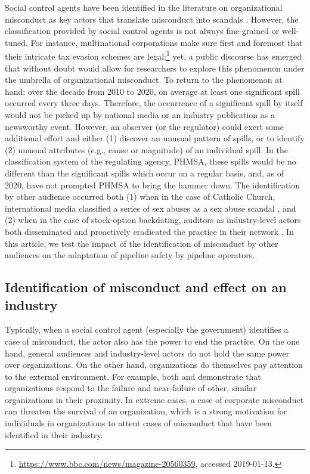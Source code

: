 Social control agents have been identified in the literature on organizational misconduct as key actors that translate misconduct into scandals \citep{Greve2010}. However, the classification provided by social control agents is not always fine-grained or well-tuned. For instance, multinational corporations make sure first and foremost that their intricate tax evasion schemes are legal;\footnote{\url{https://www.bbc.com/news/magazine-20560359}, accessed 2019-01-13.} yet, a public discourse has emerged that without doubt would allow for researchers to explore this phenomenon under the umbrella of organizational misconduct. To return to the phenomenon at hand: over the decade from 2010 to 2020, on average at least one significant spill occurred every three days. Therefore, the occurrence of a significant spill by itself would not be picked up by national media or an industry publication as a newsworthy event. However, an observer (or the regulator) could exert some additional effort and either (1) discover an unusual pattern of spills, or to identify (2) unusual attributes (e.g., cause or magnitude) of an individual spill. In the classification system of the regulating agency, PHMSA, these spills would be no different than the significant spills which occur on a regular basis, and, as of 2020, have not prompted PHMSA to bring the hammer down. The identification by other audience occurred both (1) when in the case of Catholic Church, international media classified a series of sex abuses as a sex abuse scandal \citep{Piazza2018}, and (2) when in the case of stock-option backdating, auditors as industry-level actors both disseminated and proactively eradicated the practice in their network \citep{Mohliver2019}. In this article, we test the impact of the identification of misconduct by other audiences on the adaptation of pipeline safety by pipeline operators.
	
\subsection{Identification of misconduct and effect on an industry}

Typically, when a social control agent (especially the government) identifies a case of misconduct, the actor also has the power to end the practice. On the one hand, general audiences and industry-level actors do not hold the same power over organizations. On the other hand, organizations do themselves pay attention to the external environment. For example, both \citet{Kim2007} and \citet{Madsen2010} demonstrate that organizations respond to the failure and near-failure of other, similar organizations in their proximity. In extreme cases, a case of corporate misconduct can threaten the survival of an organization, which is a strong motivation for individuals in organizations to attent cases of misconduct that have been identified in their industry.

